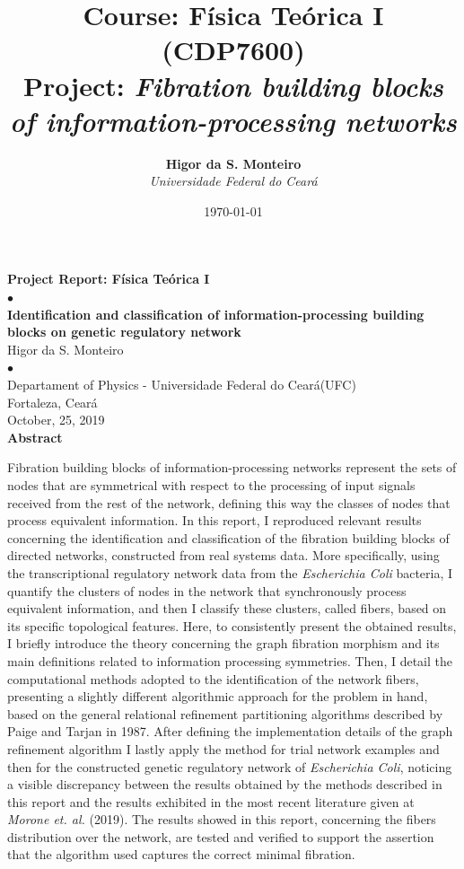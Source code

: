 \documentclass[12pt]{diazessay} %
\title{\textbf{Course: Física Teórica I (CDP7600)} \\[0.2cm] {\Large \textbf{Project}: \hspace{0.2cm}
\textit{Fibration building blocks of information-processing networks}
}}%
\author{\textbf{Higor da S. Monteiro} \\ \textit{Universidade Federal do Ceará}} %
\date{\today} %
\begin{document}

\begin{center}	
	{\LARGE \textbf{Project Report: Física Teórica I}}\\[0.25cm]
	{ $\bullet$ }\\
	\vspace{0.25cm}
	{\large \textbf{Identification and classification of information-processing building blocks on genetic regulatory network}}\\[0.25cm]
	{ Higor da S. Monteiro }\\
	{ $\bullet$ }\\
	{ Departament of Physics - Universidade Federal do Ceará(UFC) }\\
	{ Fortaleza, Ceará }\\
	{ October, 25, 2019 }\\[0.75cm]
	{\textbf{Abstract}}
	
\end{center}

Fibration building blocks of information-processing networks represent the sets of nodes that are symmetrical with respect to the processing of input signals received from the rest of the network, defining this way the classes of nodes that process equivalent information. In this report, I reproduced relevant results concerning the identification and classification of the fibration building blocks of directed networks, constructed from real systems data. More specifically, using the transcriptional regulatory network data from the \textit{Escherichia Coli} bacteria, I quantify the clusters of nodes in the network that synchronously process equivalent information, and then I classify these clusters, called fibers, based on its specific topological features. Here, to consistently present the obtained results, I briefly introduce the theory concerning the graph fibration morphism and its main definitions related to information processing symmetries. Then, I detail the computational methods adopted to the identification of the network fibers, presenting a slightly different algorithmic approach for the problem in hand, based on the general relational refinement partitioning algorithms described by Paige and Tarjan in 1987. After defining the implementation details of the graph refinement algorithm I lastly apply the method for trial network examples and then for the constructed genetic regulatory network of \textit{Escherichia Coli}, noticing a visible discrepancy between the results obtained by the methods described in this report and the results exhibited in the most recent literature given at \textit{Morone et. al.} (2019). The results showed in this report, concerning the fibers distribution over the network, are tested and verified to support the assertion that the algorithm used captures the correct minimal fibration.
\end{document}
